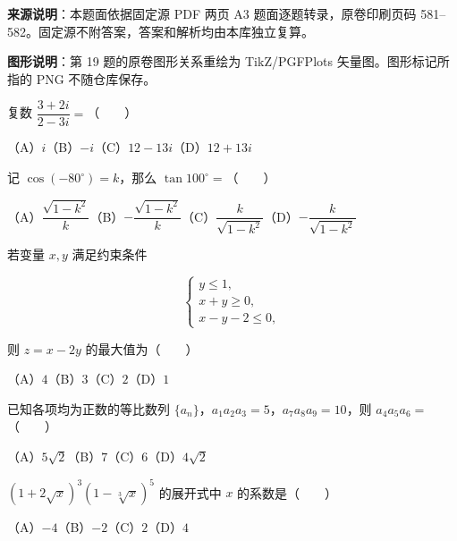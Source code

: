 


\begin{gktip}
\textbf{来源说明}：本题面依据固定源 PDF 两页 A3 题面逐题转录，原卷印刷页码 581–582。固定源不附答案，答案和解析均由本库独立复算。

\textbf{图形说明}：第 19 题的原卷图形关系重绘为 TikZ/PGFPlots 矢量图。图形标记所指的 PNG 不随仓库保存。
\end{gktip}


\begin{question}
复数 $\dfrac{3+2i}{2-3i}=$\mbox{（　　）}

（A）$i$\quad（B）$-i$\quad（C）$12-13i$\quad（D）$12+13i$

\end{question}
\begin{question}
记 $\cos(-80^\circ)=k$，那么 $\tan100^\circ=$\mbox{（　　）}

（A）$\dfrac{\sqrt{1-k^2}}k$\quad（B）$-\dfrac{\sqrt{1-k^2}}k$\quad（C）$\dfrac{k}{\sqrt{1-k^2}}$\quad（D）$-\dfrac{k}{\sqrt{1-k^2}}$

\end{question}
\begin{question}
若变量 $x,y$ 满足约束条件

\nopagebreak[4]
\[
\begin{cases}
y\leq1,\\
x+y\geq0,\\
x-y-2\leq0,
\end{cases}
\]

则 $z=x-2y$ 的最大值为\mbox{（　　）}

（A）$4$\quad（B）$3$\quad（C）$2$\quad（D）$1$

\end{question}
\begin{question}
已知各项均为正数的等比数列 $\{a_n\}$，$a_1a_2a_3=5$，$a_7a_8a_9=10$，则 $a_4a_5a_6=$\mbox{（　　）}

（A）$5\sqrt2$\quad（B）$7$\quad（C）$6$\quad（D）$4\sqrt2$

\end{question}
\begin{question}
$(1+2\sqrt{x})^3(1-\sqrt[3]{x})^5$ 的展开式中 $x$ 的系数是\mbox{（　　）}

（A）$-4$\quad（B）$-2$\quad（C）$2$\quad（D）$4$

\end{question}
